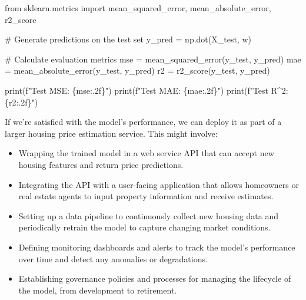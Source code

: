 \documentclass[
  9pt,
  letterpaper,
  abstract,
  titlepage]{scrbook}
\newenvironment{Shaded}{\begin{snugshade}}{\end{snugshade}}
\newcommand{\BuiltInTok}[1]{\textcolor[rgb]{0.00,0.23,0.31}{#1}}
\newcommand{\CommentTok}[1]{\textcolor[rgb]{0.37,0.37,0.37}{#1}}
\newcommand{\ImportTok}[1]{\textcolor[rgb]{0.00,0.46,0.62}{#1}}
\newcommand{\NormalTok}[1]{\textcolor[rgb]{0.00,0.23,0.31}{#1}}
\newcommand{\OperatorTok}[1]{\textcolor[rgb]{0.37,0.37,0.37}{#1}}
\newcommand{\SpecialCharTok}[1]{\textcolor[rgb]{0.37,0.37,0.37}{#1}}
\newcommand{\SpecialStringTok}[1]{\textcolor[rgb]{0.13,0.47,0.30}{#1}}
\begin{document}
\begin{Shaded}
\begin{Highlighting}[]
\ImportTok{from}\NormalTok{ sklearn.metrics }\ImportTok{import}\NormalTok{ mean\_squared\_error, mean\_absolute\_error, r2\_score}

\CommentTok{\# Generate predictions on the test set}
\NormalTok{y\_pred }\OperatorTok{=}\NormalTok{ np.dot(X\_test, w)}

\CommentTok{\# Calculate evaluation metrics}
\NormalTok{mse }\OperatorTok{=}\NormalTok{ mean\_squared\_error(y\_test, y\_pred)}
\NormalTok{mae }\OperatorTok{=}\NormalTok{ mean\_absolute\_error(y\_test, y\_pred)}
\NormalTok{r2 }\OperatorTok{=}\NormalTok{ r2\_score(y\_test, y\_pred)}

\BuiltInTok{print}\NormalTok{(}\SpecialStringTok{f"Test MSE: }\SpecialCharTok{\{}\NormalTok{mse}\SpecialCharTok{:.2f\}}\SpecialStringTok{"}\NormalTok{)}
\BuiltInTok{print}\NormalTok{(}\SpecialStringTok{f"Test MAE: }\SpecialCharTok{\{}\NormalTok{mae}\SpecialCharTok{:.2f\}}\SpecialStringTok{"}\NormalTok{)}
\BuiltInTok{print}\NormalTok{(}\SpecialStringTok{f"Test R\^{}2: }\SpecialCharTok{\{}\NormalTok{r2}\SpecialCharTok{:.2f\}}\SpecialStringTok{"}\NormalTok{)}
\end{Highlighting}
\end{Shaded}

If we're satisfied with the model's performance, we can deploy it as
part of a larger housing price estimation service. This might involve:

\begin{itemize}
\item
  Wrapping the trained model in a web service API that can accept new
  housing features and return price predictions.
\item
  Integrating the API with a user-facing application that allows
  homeowners or real estate agents to input property information and
  receive estimates.
\item
  Setting up a data pipeline to continuously collect new housing data
  and periodically retrain the model to capture changing market
  conditions.
\item
  Defining monitoring dashboards and alerts to track the model's
  performance over time and detect any anomalies or degradations.
\item
  Establishing governance policies and processes for managing the
  lifecycle of the model, from development to retirement.
\end{itemize}
\end{document}
